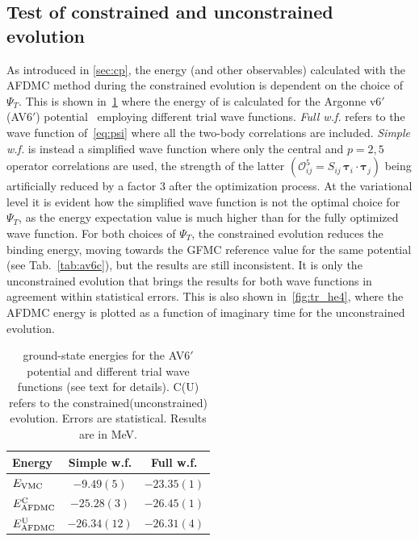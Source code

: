 \documentclass[aps,prc,twocolumn,superscriptaddress,floatfix]{revtex4-1}
\begin{document}
\subsection{Test of constrained and unconstrained evolution}
\label{sec:constr}
As introduced in \cref{sec:cp}, the energy (and other observables) calculated with the
AFDMC method during the constrained evolution is dependent on the choice of $\Psi_T$.
This is shown in~\cref{tab:tr} where the energy of  
is calculated for the Argonne v6$'$ (AV6$'$) potential~\cite{Wiringa:2002} 
employing different trial wave functions. 
\textit{Full w.f.} refers to the wave function of~\cref{eq:psi} where all the two-body 
correlations are included.
\textit{Simple w.f.} is instead a simplified wave function where only the central and
$p=2,5$ operator correlations are used, the strength of the latter 
$(\mathcal O_{ij}^5=S_{ij}\,\bm\tau_i\cdot\bm\tau_j)$ being artificially reduced by 
a factor 3 after the optimization process. At the variational level it is evident how
the simplified wave function is not the optimal choice for $\Psi_T$, as the energy
expectation value is much higher than for the fully optimized wave function. For both choices
of $\Psi_T$, the constrained evolution reduces the binding energy, moving towards the
GFMC reference value for the same potential (see Tab.~\ref{tab:av6c}), but the results are still inconsistent.
It is only the unconstrained evolution that brings the results for both wave functions 
in agreement within statistical errors. This is also shown in~\cref{fig:tr_he4}, where the 
AFDMC energy is plotted as a function of imaginary time for the unconstrained evolution. 

\setlength{\tabcolsep}{8pt}
\begin{table}[tb]
\centering
\caption[]{ ground-state energies for the AV6$'$ potential and different 
trial wave functions (see text for details). 
C(U) refers to the constrained(unconstrained) evolution.
Errors are statistical. Results are in MeV.}
\begin{tabular}{lcc}
\hline\hline
Energy & Simple w.f. & Full w.f. \\
\hline
$E_{\rm VMC}$           & $-9.49(5)$   & $-23.35(1)$ \\
$E_{\rm AFDMC}^{\rm C}$ & $-25.28(3)$  & $-26.45(1)$ \\
$E_{\rm AFDMC}^{\rm U}$ & $-26.34(12)$ & $-26.31(4)$ \\
\hline\hline
\end{tabular}
\label{tab:tr}
\end{table}
\setlength{\tabcolsep}{8pt}
\end{document}
